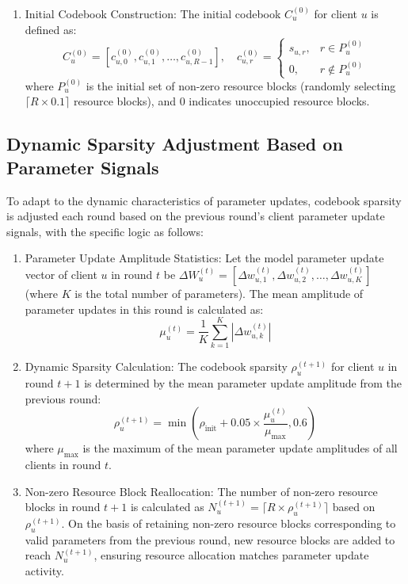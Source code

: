 \documentclass[runningheads]{llncs}
\begin{document}
\begin{enumerate}
\item Initial Codebook Construction: The initial codebook $C_u^{(0)}$ for client $u$ is defined as:
\begin{equation}
    C_u^{(0)} = \left[ c_{u,0}^{(0)}, c_{u,1}^{(0)}, \ldots, c_{u,R-1}^{(0)} \right], \quad c_{u,r}^{(0)} = 
    \begin{cases} 
    s_{u,r}, & r \in P_u^{(0)} \\ 
    0, & r \notin P_u^{(0)} 
    \end{cases}
    \label{eq:initial_codebook}\tag{7}
\end{equation}
where $P_u^{(0)}$ is the initial set of non-zero resource blocks (randomly selecting $\lceil R \times 0.1 \rceil$ resource blocks), and $0$ indicates unoccupied resource blocks.
\end{enumerate}

\subsection{Dynamic Sparsity Adjustment Based on Parameter Signals}
To adapt to the dynamic characteristics of parameter updates, codebook sparsity is adjusted each round based on the previous round's client parameter update signals, with the specific logic as follows:
\begin{enumerate}
\item Parameter Update Amplitude Statistics: Let the model parameter update vector of client $u$ in round $t$ be $\Delta W_u^{(t)} = [\Delta w_{u,1}^{(t)}, \Delta w_{u,2}^{(t)}, \ldots, \Delta w_{u,K}^{(t)}]$ (where $K$ is the total number of parameters). The mean amplitude of parameter updates in this round is calculated as:
\begin{equation*}
    \mu_u^{(t)} = \frac{1}{K}\sum_{k=1}^K |\Delta w_{u,k}^{(t)}|\tag{8}
\end{equation*}

\item Dynamic Sparsity Calculation: The codebook sparsity $\rho_u^{(t+1)}$ for client $u$ in round $t+1$ is determined by the mean parameter update amplitude from the previous round:
\begin{equation}
    \rho_u^{(t+1)} = \min\left( \rho_{\text{init}} + 0.05 \times \frac{\mu_u^{(t)}}{\mu_{\text{max}}}, 0.6 \right)
    \label{eq:dynamic_sparsity}\tag{9}
\end{equation}
where $\mu_{\text{max}}$ is the maximum of the mean parameter update amplitudes of all clients in round $t$.

\item Non-zero Resource Block Reallocation: The number of non-zero resource blocks in round $t+1$ is calculated as $N_u^{(t+1)} = \lceil R \times \rho_u^{(t+1)} \rceil$ based on $\rho_u^{(t+1)}$. On the basis of retaining non-zero resource blocks corresponding to valid parameters from the previous round, new resource blocks are added to reach $N_u^{(t+1)}$, ensuring resource allocation matches parameter update activity.
\end{enumerate}
\end{document}

